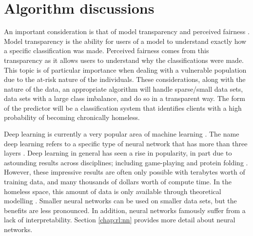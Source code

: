 \section{Algorithm discussions} \label{chap:intro:algos}
An important consideration is that of model transparency and perceived fairness \cite{karusala2019street}. Model transparency is the ability for users of a model to understand exactly how a specific classification was made. Perceived fairness comes from this transparency as it allows users to understand why the classifications were made. This topic is of particular importance when dealing with a vulnerable population \cite{eubanks2018automating} due to the at-risk nature of the individuals. These considerations, along with the nature of the data, an appropriate algorithm will handle sparse/small data sets, data sets with a large class imbalance, and do so in a transparent way. The form of the predictor will be a classification system that identifies clients with a high probability of becoming chronically homeless.

Deep learning is currently a very popular area of machine learning\cite{vanberlo2020interpretable} \cite{fisher2020simulating}. The name deep learning refers to a specific type of neural network that has more than three layers \cite{ibm2020dl}. Deep learning in general has seen a rise in popularity, in part due to astounding results across disciplines; including game-playing \cite{deepmind2020go} and protein folding \cite{deepmind2020alphafold2}. However, these impressive results are often only possible with terabytes worth of training data, and many thousands of dollars worth of compute time. In the homeless space, this amount of data is only available through theoretical modelling \cite{fisher2020simulating}. Smaller neural networks can be used on smaller data sets, but the benefits are less pronounced. In addition, neural networks famously suffer from a lack of interpretability. Section \ref{chap:rl:nn} provides more detail about neural networks.

